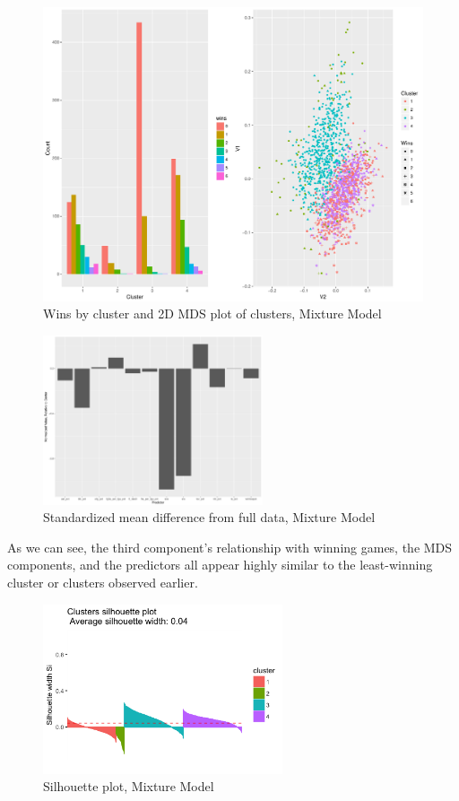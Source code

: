 \documentclass[10pt,a4paper, hidelinks]{article} %
\begin{document}
\begin{figure}[H]
	\centering
	\includegraphics[width=0.7\linewidth]{../fig/sirmixalot}
	\caption{Wins by cluster and 2D MDS plot of clusters, Mixture Model}
\end{figure}

\begin{figure}[H]
	\centering
	\includegraphics[height=5cm]{../fig/mixweak}
	\caption{Standardized mean difference from full data, Mixture Model}
\end{figure}

As we can see, the third component's relationship with winning games, the MDS components, and the predictors all appear highly similar to the least-winning cluster or clusters observed earlier.

\begin{figure}[H]
	\centering
	\includegraphics[height=5cm]{"../fig/mixsil"}
	\caption{Silhouette plot, Mixture Model}
\end{figure}
\end{document}
